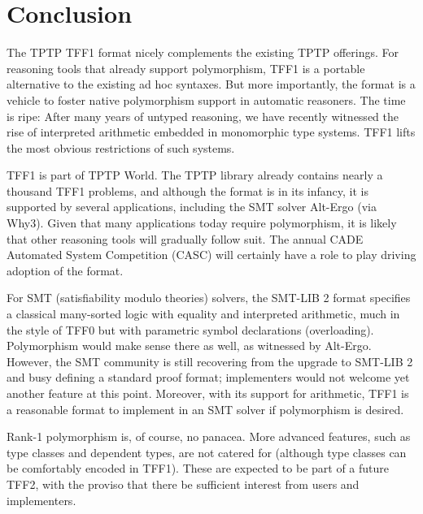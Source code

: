 \section{Conclusion}
\label{sec_concl}

The TPTP TFF1 format nicely complements the existing TPTP
offerings. %
For reasoning tools that already
support polymorphism, TFF1 is a portable alternative to the existing ad hoc
syntaxes. But more importantly, the format is a vehicle to foster native
polymorphism support in automatic reasoners.
The time is ripe: After many
years of untyped reasoning, we have recently witnessed the rise of
interpreted arithmetic embedded in monomorphic type systems. TFF1
lifts the most obvious restrictions of such systems.

TFF1 is part of TPTP World. The TPTP library already contains
nearly a thousand TFF1 problems, and although the format is in its
infancy, it is supported by several applications, including the SMT solver
Alt-Ergo (via Why3).
Given that many applications today require polymorphism, it
is likely that other reasoning tools will gradually follow suit.
The annual CADE Automated
System Competition (CASC) will certainly have a
role to play driving adoption of the format.

For SMT (satisfiability modulo theories) solvers, the SMT-LIB 2 format \cite{barrett-et-al-2010} specifies a
classical many-sorted logic with equality and interpreted arithmetic, much in
the style of TFF0 but with parametric symbol declarations (overloading).
Polymorphism would make sense there as well, as witnessed by Alt-Ergo.
However, the SMT community is still recovering from the %
upgrade to SMT-LIB 2 and busy defining a standard proof format;
implementers would %
not welcome yet another
feature at this point. Moreover, with its support for arithmetic, TFF1 is a
reasonable format to implement in an SMT solver if polymorphism is desired.

Rank-1 polymorphism is, of course, no panacea. More advanced features, such as
type classes and dependent types, are not catered for (although type
classes can be comfortably encoded in TFF1). These are expected to be
part of a future TFF2, with the proviso that there be sufficient interest from
users and implementers.

